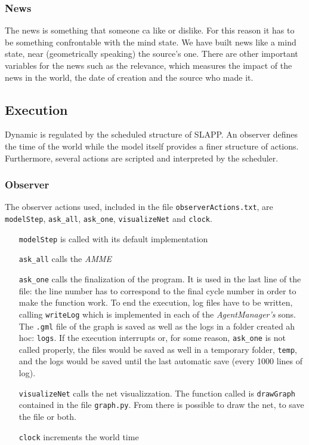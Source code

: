 \subsubsection{News}
The news is something that someone ca like or dislike. For this reason
it has to be something confrontable with the mind state.
We have built news like  a mind state, near (geometrically speaking)
the source's one. There are other important variables for the news such as
the relevance, which measures the impact of the news in the world, the
date of creation and the source who made it.

\subsection{Execution}
Dynamic is regulated by the scheduled structure of SLAPP. An observer defines
the time of the world while the model itself provides a finer structure of
actions. Furthermore, several actions are scripted and interpreted by
the scheduler.

\subsubsection{Observer}
The observer actions used, included in the file \texttt{observerActions.txt},
are \texttt{modelStep}, \texttt{ask\_all}, \texttt{ask\_one},
\texttt{visualizeNet} and \texttt{clock}.
\begin{itemize}
\item [\texttt{modelStep}] is called with its default implementation
\item [\texttt{ask\_all}] calls the \textit{AMME}
\item [\texttt{ask\_one}] calls the finalization of the program. It
  is used in the last line of the file: the line number has to correspond
  to the final cycle number in order to make the function work.
  To end the execution, log files have to be written, calling
  \texttt{writeLog} which is implemented in each of the \textit{AgentManager's}
  sons. The \texttt{.gml} file of the graph is saved as well as the logs
  in a folder created ah hoc: \texttt{logs}.
  If the execution interrupts or, for some reason, \texttt{ask\_one} is not
  called properly, the files would be saved as well in a temporary folder,
  \texttt{temp}, and the logs would be saved until the last
  automatic save (every 1000 lines of log).
\item [\texttt{visualizeNet}] calls the net visualizzation. The function called
  is \texttt{drawGraph} contained in the file \texttt{graph.py}.
  From there is possible to draw the net, to save the file or both.
\item [\texttt{clock}] increments the world time 
\end{itemize}

